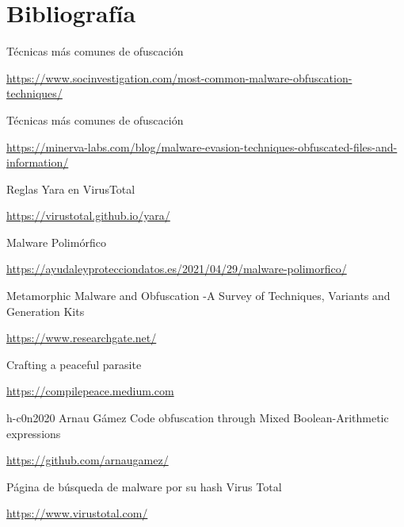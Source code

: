 \documentclass[15pt]{article}
\begin{document}
	\section{Bibliografía}
	\begin{thebibliography}{40}
		Técnicas más comunes de ofuscación
		
		\href{https://www.socinvestigation.com/most-common-malware-obfuscation-techniques/}{https://www.socinvestigation.com/most-common-malware-obfuscation-techniques/}
		
		Técnicas más comunes de ofuscación
		
		\href{https://minerva-labs.com/blog/malware-evasion-techniques-obfuscated-files-and-information/}{https://minerva-labs.com/blog/malware-evasion-techniques-obfuscated-files-and-information/}
		
		Reglas Yara en VirusTotal
		
		\href{https://virustotal.github.io/yara/}{https://virustotal.github.io/yara/}
		
		Malware Polimórfico
		
		\href{https://ayudaleyprotecciondatos.es/2021/04/29/malware-polimorfico/}{https://ayudaleyprotecciondatos.es/2021/04/29/malware-polimorfico/}
		
		Metamorphic Malware and Obfuscation -A Survey of Techniques, Variants and Generation Kits
		
		\href{https://www.researchgate.net/publication/357255382_Metamorphic_Malware_and_Obfuscation_-A_Survey_of_Techniques_Variants_and_Generation_Kits}{https://www.researchgate.net/}
		
		Crafting a peaceful parasite
		
		\href{https://compilepeace.medium.com/malware-engineering-part-0x3-crafting-a-peaceful-parasite-c8c6c9a0b010}{https://compilepeace.medium.com}
		
		h-c0n2020 Arnau Gámez Code obfuscation through Mixed Boolean-Arithmetic expressions
		
		\href{https://github.com/arnaugamez/talks/blob/main/2022/00_h-c0n/slides.pdf}{https://github.com/arnaugamez/}
		
		
		Página de búsqueda de malware por su hash Virus Total
		
		\href{https://www.virustotal.com/gui/home/upload}{https://www.virustotal.com/}
		

\end{thebibliography}
\end{document}
